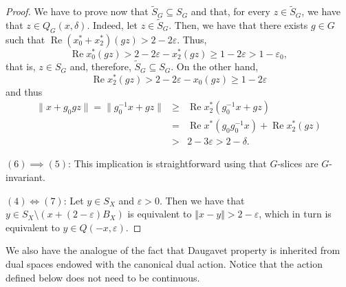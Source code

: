 \documentclass[a4paper,12pt]{amsart}
\theoremstyle{definition}
\theoremstyle{definition}
\theoremstyle{remark}
\numberwithin{equation}{section}
\DeclareMathOperator{\re}{Re}
\renewcommand{\geq}{\geqslant}
\newcommand{\<}{\langle}
\renewcommand{\>}{\rangle}
\newcommand{\norm}[1]{\left\Vert#1\right\Vert}
\newcommand{\e}{\varepsilon}
\newcommand{\eps}{\e}
\begin{document}
\begin{proof}
		We have to prove now that $\tilde{S}_G \subseteq S_G$ and that, for every $z \in \tilde{S}_G$, we have that $z \in Q_G(x,\delta)$. Indeed, let $z \in \tilde{S}_G$. Then, we have that there exists $g \in G$ such that $\re (x_0^*+x_2^*)(gz) > 2 - 2 \e$. Thus,
		\begin{equation*}
			\re  x_0^*(gz) > 2 - 2\e - x_2^*(gz) \geq 1 - 2\e > 1 - \e_0,
		\end{equation*}
		that is, $z \in S_G$ and, therefore, $\tilde{S}_G \subseteq S_G$.  On the other hand,
		\begin{equation*}
			\re x_2^*(gz) > 2- 2\e - x_0(gz) \geq 1 - 2\e 
		\end{equation*}
		and thus
		\begin{eqnarray*}
			\|x+g_0gz\| = \|g_0^{-1}x + gz\| &\geq& \re x_2^*(g_0^{-1}x + gz) \\
			&=& \re x^*(g_0g_0^{-1}x) + \re x_2^*(gz) \\
			&>&2-3\e > 2- \delta.
		\end{eqnarray*}
		
		\noindent
		$(6) \implies (5)$: This implication is straightforward using that $G$-slices are $G$-invariant.
		
		
		\noindent
		$(4) \iff (7)$: Let $y \in S_X$ and $\eps > 0$. Then we have that $y \in S_X \setminus (x + (2-\eps) B_X)$ is equivalent to $\norm{x - y} > 2 - \eps$, which in turn is equivalent to $y \in Q(-x, \eps)$.
	\end{proof}
	
	
	
	
	
	
	
	
	
	
	We also have the analogue of the fact that Daugavet property is inherited from dual spaces endowed with the canonical dual action. Notice that the action defined below does not need to be continuous.
	
\end{document}
